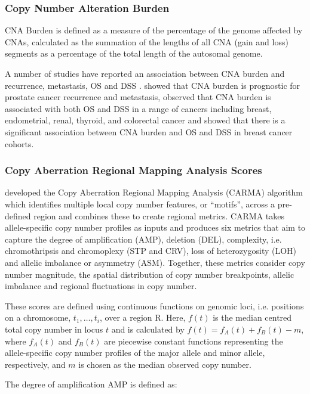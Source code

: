 \subsubsection{Copy Number Alteration Burden}
\label{CNABurden}
CNA Burden is defined as a measure of the percentage of the genome affected by CNAs, calculated as the summation of the lengths of all CNA (gain and loss) segments as a percentage of the total length of the autosomal genome. 

A number of studies have reported an association between CNA burden and recurrence, metastasis, OS and DSS \citep{pmid25024180, pmid30178746, pmid30337938}. \cite{pmid25024180} showed that CNA burden is prognostic for prostate cancer recurrence and metastasis, \cite{pmid30178746} observed that CNA burden is associated with both OS and DSS in a range of cancers including breast, endometrial, renal, thyroid, and colorectal cancer and \cite{pmid30337938} showed that there is a significant association between CNA burden and OS and DSS in breast cancer cohorts.

\subsubsection{Copy Aberration Regional Mapping Analysis Scores}
\label{CARMA}
\cite{pmid32242091} developed the Copy Aberration Regional Mapping Analysis (CARMA) algorithm which identifies multiple local copy number features, or “motifs”, across a pre-defined region and combines these to create regional metrics. CARMA takes allele-specific copy number profiles as inputs and produces six metrics that aim to capture the degree of amplification (AMP), deletion (DEL), complexity, i.e. chromothripsis and chromoplexy (STP and CRV), loss of heterozygosity (LOH) and allelic imbalance or asymmetry (ASM). Together, these metrics consider copy number magnitude, the spatial distribution of copy number breakpoints, allelic imbalance and regional fluctuations in copy number.  

These scores are defined using continuous functions on genomic loci, i.e. positions on a chromosome, $t_1, …, t_i$, over a region R. Here, $f(t)$ is the median centred total copy number in locus $t$ and is calculated by $f(t) = f_A(t) + f_B(t) - m$, where $f_A(t)$ and $f_B(t)$ are piecewise constant functions representing the allele-specific copy number profiles of the major allele and minor allele, respectively, and $m$ is chosen as the median observed copy number.   

The degree of amplification AMP is defined as:

